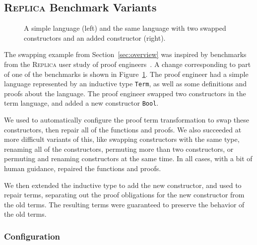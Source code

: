 \iffalse
\subsection{\textsc{Replica} Benchmark Variants}
\label{sec:replica}

\begin{figure}
\begin{minipage}{0.49\columnwidth}
   
\end{minipage}
\hfill
\begin{minipage}{0.49\columnwidth}
   
\end{minipage}
\vspace{-0.4cm}
\caption{A simple language (left) and the same language with two swapped constructors and an added constructor (right).}
\label{fig:replica}
\end{figure}

The swapping example from Section~\ref{sec:overview} was inspired by benchmarks 
from the \textsc{Replica} user study of proof engineers~\cite{replica}.
A change corresponding to part of one of the benchmarks is shown in Figure~\ref{fig:replica}.
The proof engineer had a simple language represented by an inductive type \lstinline{Term},
as well as some definitions and proofs about the language.
The proof engineer swapped two constructors in the term language,
and added a new constructor \lstinline{Bool}.

We used \toolname to automatically configure the proof term transformation to swap these constructors,
then repair all of the functions and proofs.
We also succeeded at more difficult variants of this,
like swapping constructors with the same type, renaming all of the constructors,
permuting more than two constructors,
or permuting and renaming constructors at the same time.
In all cases, with a bit of human guidance, \toolname repaired the functions and proofs.

We then extended the inductive type to add the new constructor, and used \toolname to repair terms,
separating out the proof obligations for the new constructor from the old terms.
The resulting terms were guaranteed to preserve the behavior of the old terms.

\subsubsection{Configuration}

